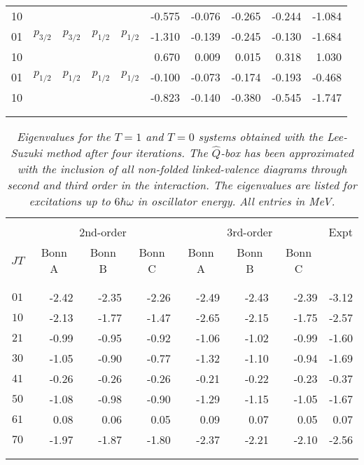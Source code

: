 \begin{table}[hbtp]
\begin{center}
\begin{tabular}{lllllrrrrr}
10&&&&&-0.575&-0.076&-0.265&-0.244&-1.084\\
01&$p_{3/2}$&$p_{3/2}$&$p_{1/2}$&$p_{1/2}$
&-1.310&-0.139&-0.245&-0.130&-1.684\\
10&&&&&0.670&0.009&0.015&0.318&1.030\\
01&$p_{1/2}$&$p_{1/2}$&$p_{1/2}$&$p_{1/2}$
&-0.100&-0.073&-0.174&-0.193&-0.468\\
10&&&&&-0.823&-0.140&-0.380&-0.545&-1.747\\
&&&&&&&&&\\
&&&&&&&&&\\ \hline
\end{tabular}
\end{center}
\label{tab:diags}
\end{table}

\clearpage
\begin{table}[hbtp]
\caption{{\em Eigenvalues for the $T=1$ and $T=0$ systems
obtained with the
Lee-Suzuki method after four iterations.
The $\hat{Q}$-box has been
approximated with the inclusion of all non-folded
linked-valence diagrams through second and third order in the interaction.
The eigenvalues are listed for excitations up to $6\hbar\omega$
in oscillator energy. All entries
in MeV.}}
\begin{center}
\begin{tabular}{crrrrrrr}
\hline
&&&&&&&\\
&\multicolumn{3}{c}{2nd-order}&
\multicolumn{3}{c}{3rd-order}&
\multicolumn{1}{c}{Expt}\\
$JT$&
\multicolumn{1}{c}{Bonn A}&
\multicolumn{1}{c}{Bonn B}&
\multicolumn{1}{c}{Bonn C}&
\multicolumn{1}{c}{Bonn A}&
\multicolumn{1}{c}{Bonn B}&
\multicolumn{1}{c}{Bonn C}&
\\&&&&&&&\\  \hline&&&&&&&\\
$01$&-2.42&-2.35&-2.26&-2.49&-2.43&-2.39&-3.12\\
$10$&-2.13&-1.77&-1.47&-2.65&-2.15&-1.75&-2.57\\
$21$&-0.99&-0.95&-0.92&-1.06&-1.02&-0.99&-1.60\\
$30$&-1.05&-0.90&-0.77&-1.32&-1.10&-0.94&-1.69\\
$41$&-0.26&-0.26&-0.26&-0.21&-0.22&-0.23&-0.37\\
$50$&-1.08&-0.98&-0.90&-1.29&-1.15&-1.05&-1.67\\
$61$&0.08&0.06&0.05&0.09&0.07&0.05&0.07\\
$70$&-1.97&-1.87&-1.80&-2.37&-2.21&-2.10&-2.56\\
&&&&&&&\\
&&&&&&&\\ \hline
\end{tabular}
\end{center}
\label{tab:casc}
\end{table}

